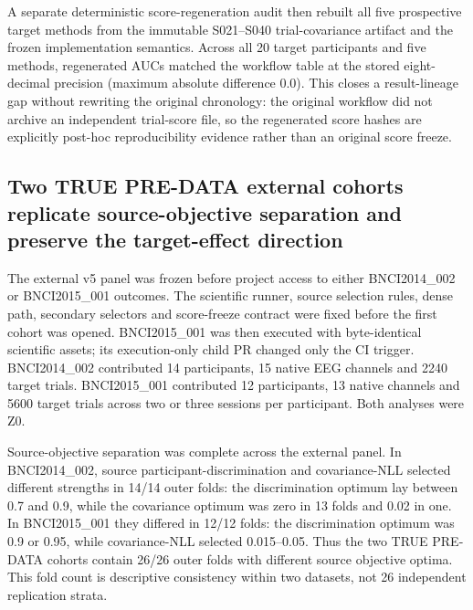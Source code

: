 A separate deterministic score-regeneration audit then rebuilt all five
prospective target methods from the immutable S021--S040 trial-covariance
artifact and the frozen implementation semantics. Across all 20 target
participants and five methods, regenerated AUCs matched the workflow table at
the stored eight-decimal precision (maximum absolute difference 0.0).
This closes a result-lineage gap without rewriting the original chronology:
the original workflow did not archive an independent trial-score file, so the
regenerated score hashes are explicitly post-hoc reproducibility evidence
rather than an original score freeze.

\subsection{Two TRUE PRE-DATA external cohorts replicate source-objective separation and preserve the target-effect direction}
The external v5 panel was frozen before project access to either
BNCI2014\_002 or BNCI2015\_001 outcomes. The scientific runner, source
selection rules, dense path, secondary selectors and score-freeze contract
were fixed before the first cohort was opened. BNCI2015\_001 was then
executed with byte-identical scientific assets; its execution-only child PR
changed only the CI trigger. BNCI2014\_002 contributed 14 participants,
15 native EEG channels and 2240 target trials. BNCI2015\_001 contributed
12 participants, 13 native channels and 5600 target trials across two or
three sessions per participant. Both analyses were Z0.

Source-objective separation was complete across the external panel. In
BNCI2014\_002, source participant-discrimination and covariance-NLL selected
different strengths in 14/14 outer folds: the discrimination optimum lay
between 0.7 and 0.9, while the covariance optimum was zero in 13 folds and
0.02 in one. In BNCI2015\_001 they differed in 12/12 folds: the
discrimination optimum was 0.9 or 0.95, while covariance-NLL selected
0.015--0.05. Thus the two TRUE PRE-DATA cohorts contain 26/26 outer folds
with different source objective optima. This fold count is descriptive
consistency within two datasets, not 26 independent replication strata.

